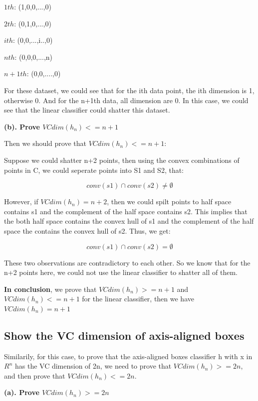 \documentclass{article} %
\begin{document}
$1th$: \quad (1,0,0,...,0)

$2th$: \quad (0,1,0,...,0)

$ith$: \quad (0,0,...,i..,0)

$nth$: \quad (0,0,0,...,n)

$n+1th$: \quad (0,0,....,0)

For these dataset, we could see that for the ith data point, the ith dimension
is 1, otherwise 0. And for the n+1th data, all dimension are 0. In this case, we
could see that the linear classifier could shatter this dataset.

\textbf{(b). Prove $VCdim(h_n) <= n+1$}

Then we should prove that $VCdim(h_n) <= n+1$:

Suppose we could shatter n+2 points, then using the convex combinations of
points in C, we could seperate points into S1 and S2, that:

\begin{equation}
conv(s1) \cap conv(s2) \neq \emptyset
\end{equation}

However, if $VCdim(h_n) = n+2$, then we could spilt points to half space
contains s1 and the complement of the half space contains s2. This implies that
the both half space contains the convex hull of s1 and the complement of the
half space the contains the convex hull of s2. Thus, we get:

\begin{equation}
conv(s1) \cap conv(s2) = \emptyset
\end{equation}

These two observations are contradictory to each other. So we know that for the
n+2 points here, we could not use the linear classifier to shatter all of them.

\textbf{In conclusion}, we prove that $VCdim(h_n) >= n+1$ and $VCdim(h_n) <= n+1$ for the
linear classifier, then we have $VCdim(h_n) = n+1$


\subsection{Show the VC dimension of axis-aligned boxes}

Similarily, for this case, to prove that the axis-aligned boxes classifier h
with x in $ R^n $ has the VC dimension of 2n, we need to prove that
$VCdim(h_n) >= 2n$, and then prove that $VCdim(h_n) <= 2n$.

\textbf{(a). Prove $VCdim(h_n) >= 2n$}
\end{document}
